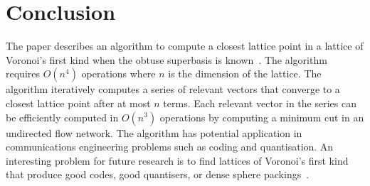 \documentclass[final,leqno]{siamltex}
\begin{document}

\section{Conclusion}

The paper describes an algorithm to compute a closest lattice point in a lattice of Voronoi's first kind when the obtuse superbasis is known~\cite{ConwaySloane1992_voronoi_lattice_3d_obtuse_superbases}.  The algorithm requires $O(n^4)$ operations where $n$ is the dimension of the lattice.  The algorithm iteratively computes a series of relevant vectors that converge to a closest lattice point after at most $n$ terms.   Each relevant vector in the series can be efficiently computed in $O(n^3)$ operations by computing a minimum cut in an undirected flow network.  The algorithm has potential application in communications engineering problems such as coding and quantisation.  An interesting problem for future research is to find lattices of Voronoi's first kind that produce good codes, good quantisers, or dense sphere packings~\cite{SPLAG,Conway1982VoronoiRegions}.


\end{document}
